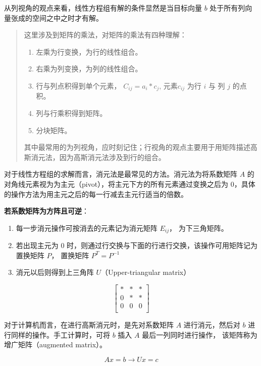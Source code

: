 \documentclass[
  letterpaper,
  DIV=11,
  numbers=noendperiod]{scrartcl}
\providecommand{\tightlist}{%
  \setlength{\itemsep}{0pt}\setlength{\parskip}{0pt}}\usepackage{longtable,booktabs,array}
\begin{document}
从列视角的观点来看，线性方程组有解的条件显然是当目标向量 \(b\)
处于所有列向量张成的空间之中之时才有解。

\begin{quote}
这里涉及到矩阵的乘法，对矩阵的乘法有四种理解：

\begin{enumerate}
\def\labelenumi{\arabic{enumi}.}
\tightlist
\item
  左乘为行变换，为行的线性组合。
\item
  右乘为列变换，为列的线性组合。
\item
  行与列点积得到单个元素， \(C_{ij} = a_i * c_j\), 元素\(c_{ij}\) 为行
  \(i\) 与 列 \(j\) 的点积。
\item
  列与行乘积得到矩阵。
\item
  分块矩阵。
\end{enumerate}

其中最常用的为列视角，应时刻记住；行视角的观点主要用于用矩阵描述高斯消元法，因为高斯消元法涉及到行的组合。
\end{quote}

对于线性方程组的求解而言，消元法是最常见的方法。消元法为将系数矩阵 \(A\)
的对角线元素视为为主元（pivot），将主元下方的所有元素通过变换之后为
0，具体的操作方法为用主元之后的每一行减去主元行适当的倍数。

\textbf{若系数矩阵为方阵且可逆}：

\begin{enumerate}
\def\labelenumi{\arabic{enumi}.}
\item
  每一步消元操作可按消去的元素记为消元矩阵 \(E_{ij}\)， 为下三角矩阵。
\item
  若出现主元为 0
  时，则通过行交换与下面的行进行交换，该操作可用矩阵记为置换矩阵 \(P\)，
  置换矩阵 \(P^T = P^{-1}\)
\item
  消元以后则得到上三角阵 \(U\)（Upper-triangular matrix）
\end{enumerate}

\[
\begin{bmatrix}
* & * & * \\
0 & * & * \\
0 & 0 & 0 \\
\end{bmatrix}
\]

对于计算机而言，在进行高斯消元时，是先对系数矩阵 \(A\) 进行消元，然后对
\(b\) 进行同样的操作。手工计算时，可将 \(b\) 插入 \(A\)
最后一列同时进行操作， 该矩阵称为增广矩阵（augmented matrix）。

\[
Ax = b \rightarrow Ux = c
\]
\end{document}
